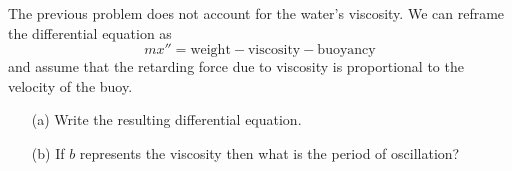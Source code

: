 \begin{problem}
    The previous problem does not account for the water's viscosity.  We can reframe the
    differential equation as 
    \[ mx'' = \text{weight} - \text{viscosity} - \text{buoyancy} \]
    and assume that the retarding force due to viscosity is proportional to the
    velocity of the buoy.
    \begin{itemize}
        \item[(a)] Write the resulting differential equation.
        \item[(b)] If $b$ represents the viscosity then what is the period of oscillation?
    \end{itemize}
\end{problem}
\solution{
    \[ \rho \pi r^2 h x'' = \pi r^2 h \rho g - b x' - \pi r^2 g x \implies x'' =
        \frac{g}{\rho h} \left( \rho h - x \right) - \frac{b}{\rho \pi r^2 h} x' 
    \]
    \[ \implies y'' + \frac{b}{\rho \pi r^2 h} y' + \frac{g}{\rho h} y = 0 \]
    \[ \implies k = \frac{-B \pm \sqrt{B^2 - 4 \frac{g}{\rho h}}}{2} =
        \frac{\frac{b}{\rho \pi r^2 h} \pm \sqrt{\frac{b^2}{\rho^2 \pi^2 r^4 h^2} -
    \frac{4g}{\rho h}   } }{2} \]
    \[ \implies \text{frequency} =\frac{1}{2} \sqrt{\frac{b^2}{\rho^2 \pi^2 r^4 h^2} -
    \frac{4g}{\rho h}} \]

}

